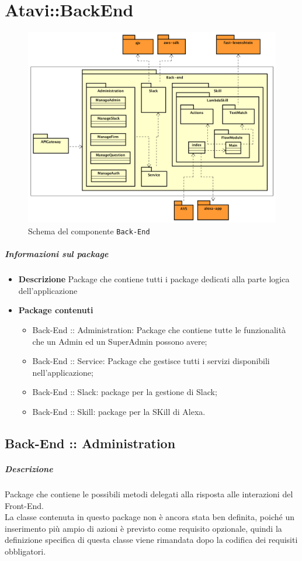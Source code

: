 \documentclass[../ManualeSviluppatore_v1.0.0.tex]{subfiles}
\begin{document}
\section{Atavi::BackEnd}

\begin{figure}[!h]
	\centering
	\includegraphics[scale=0.3]{Architettura/Back-end.png}
	\caption{Schema del componente \texttt{Back-End}}
\end{figure}
\subparagraph{Informazioni sul package}
\begin{itemize}
	\item \textbf{Descrizione} Package che contiene tutti i package dedicati alla parte logica dell'applicazione
	\item \textbf{Package contenuti}
	      \begin{itemize}
	      	\item Back-End :: Administration: Package che contiene tutte le funzionalità che un Admin ed un SuperAdmin possono avere;
	      	\item Back-End :: Service: Package che gestisce tutti i servizi disponibili nell'applicazione;
	      	\item Back-End :: Slack: package per la gestione di Slack;
	      	\item Back-End :: Skill: package per la SKill di Alexa.
	      \end{itemize}
\end{itemize}

\subsection{Back-End :: Administration}
\subparagraph{Descrizione} Package che contiene le possibili metodi delegati alla risposta alle interazioni del Front-End.\\
La classe contenuta in questo package non è ancora stata ben definita, poiché un inserimento più ampio di azioni è previsto come requisito opzionale, quindi la definizione specifica di questa classe viene rimandata dopo la codifica dei requisiti obbligatori.
\end{document}
